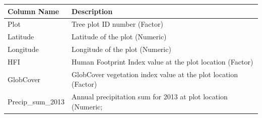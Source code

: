 \documentclass[12pt,]{article}
\begin{document}
\begin{longtable}[]{@{}ll@{}}
\toprule
\begin{minipage}[b]{0.53\columnwidth}\raggedright
Column Name\strut
\end{minipage} & \begin{minipage}[b]{0.41\columnwidth}\raggedright
Description\strut
\end{minipage}\tabularnewline
\midrule
\endhead
\begin{minipage}[t]{0.53\columnwidth}\raggedright
Plot\strut
\end{minipage} & \begin{minipage}[t]{0.41\columnwidth}\raggedright
Tree plot ID number (Factor)\strut
\end{minipage}\tabularnewline
\begin{minipage}[t]{0.53\columnwidth}\raggedright
Latitude\strut
\end{minipage} & \begin{minipage}[t]{0.41\columnwidth}\raggedright
Latitude of the plot (Numeric)\strut
\end{minipage}\tabularnewline
\begin{minipage}[t]{0.53\columnwidth}\raggedright
Longitude\strut
\end{minipage} & \begin{minipage}[t]{0.41\columnwidth}\raggedright
Longitude of the plot (Numeric)\strut
\end{minipage}\tabularnewline
\begin{minipage}[t]{0.53\columnwidth}\raggedright
HFI\strut
\end{minipage} & \begin{minipage}[t]{0.41\columnwidth}\raggedright
Human Footprint Index value at the plot location (Factor)\strut
\end{minipage}\tabularnewline
\begin{minipage}[t]{0.53\columnwidth}\raggedright
GlobCover\strut
\end{minipage} & \begin{minipage}[t]{0.41\columnwidth}\raggedright
GlobCover vegetation index value at the plot location (Factor)\strut
\end{minipage}\tabularnewline
\begin{minipage}[t]{0.53\columnwidth}\raggedright
Precip\_sum\_2013\strut
\end{minipage} & \begin{minipage}[t]{0.41\columnwidth}\raggedright
Annual precipitation sum for 2013 at plot location (Numeric;

\end{minipage}
\end{longtable}
\end{document}
